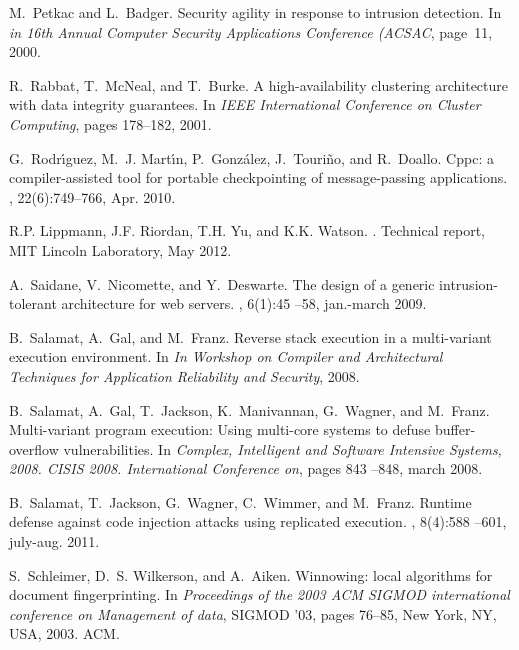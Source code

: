 \documentclass{acm_proc_article-sp}
\begin{document}
\begin{thebibliography}{10}
M.~Petkac and L.~Badger.
\newblock Security agility in response to intrusion detection.
\newblock In {\em in 16th Annual Computer Security Applications Conference
  (ACSAC}, page~11, 2000.

R.~Rabbat, T.~McNeal, and T.~Burke.
\newblock A high-availability clustering architecture with data integrity
  guarantees.
\newblock In {\em IEEE International Conference on Cluster Computing}, pages
  178--182, 2001.

G.~Rodr\'{\i}guez, M.~J. Mart\'{\i}n, P.~Gonz\'{a}lez, J.~Touri\~{n}o, and
  R.~Doallo.
\newblock Cppc: a compiler-assisted tool for portable checkpointing of
  message-passing applications.
, 22(6):749--766, Apr. 2010.

{R.P. Lippmann}, {J.F. Riordan}, {T.H. Yu}, and {K.K. Watson}.
.
\newblock Technical report, MIT Lincoln Laboratory, May 2012.

A.~Saidane, V.~Nicomette, and Y.~Deswarte.
\newblock The design of a generic intrusion-tolerant architecture for web
  servers.
, 6(1):45
  --58, jan.-march 2009.

B.~Salamat, A.~Gal, and M.~Franz.
\newblock Reverse stack execution in a multi-variant execution environment.
\newblock In {\em In Workshop on Compiler and Architectural Techniques for
  Application Reliability and Security}, 2008.

B.~Salamat, A.~Gal, T.~Jackson, K.~Manivannan, G.~Wagner, and M.~Franz.
\newblock Multi-variant program execution: Using multi-core systems to defuse
  buffer-overflow vulnerabilities.
\newblock In {\em Complex, Intelligent and Software Intensive Systems, 2008.
  CISIS 2008. International Conference on}, pages 843 --848, march 2008.

B.~Salamat, T.~Jackson, G.~Wagner, C.~Wimmer, and M.~Franz.
\newblock Runtime defense against code injection attacks using replicated
  execution.
, 8(4):588
  --601, july-aug. 2011.

S.~Schleimer, D.~S. Wilkerson, and A.~Aiken.
\newblock Winnowing: local algorithms for document fingerprinting.
\newblock In {\em Proceedings of the 2003 ACM SIGMOD international conference
  on Management of data}, SIGMOD '03, pages 76--85, New York, NY, USA, 2003.
  ACM.


\end{thebibliography}
\end{document}
